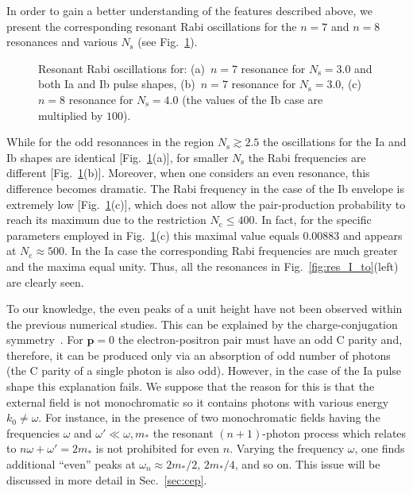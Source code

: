 \documentclass[preprint,aps,prd,showpacs,floatfix]{revtex4-1}
\begin{document}
\indent In order to gain a better understanding of the features described above, we present the corresponding resonant Rabi oscillations for the $n=7$ and $n=8$ resonances and various $N_\text{s}$ (see Fig.~\ref{fig:I_rabi}).
%
\begin{figure}[h]
\caption{Resonant Rabi oscillations for: (a)~$n=7$ resonance for $N_\text{s} = 3.0$ and both Ia and Ib pulse shapes, (b)~$n=7$ resonance for $N_\text{s} = 3.0$, (c)~$n=8$ resonance for $N_\text{s} = 4.0$ (the values of the Ib case are multiplied by $100$).}
\label{fig:I_rabi}
\end{figure}
%
While for the odd resonances in the region $N_\text{s} \gtrsim 2.5$ the oscillations for the Ia and Ib shapes are identical [Fig.~\ref{fig:I_rabi}(a)], for smaller $N_\text{s}$ the Rabi frequencies are different [Fig.~\ref{fig:I_rabi}(b)]. Moreover, when one considers an even resonance, this difference becomes dramatic. The Rabi frequency in the case of the Ib envelope is extremely low [Fig.~\ref{fig:I_rabi}(c)], which does not allow the pair-production probability to reach its maximum due to the restriction $N_\text{c} \leq 400$. In fact, for the specific parameters employed in Fig.~\ref{fig:I_rabi}(c) this maximal value equals 0.00883 and appears at $N_\text{c} \approx 500$. In the Ia case the corresponding Rabi frequencies are much greater and the maxima equal unity. Thus, all the resonances in Fig.~\ref{fig:res_I_to}(left) are clearly seen.

\indent To our knowledge, the even peaks of a unit height have not been observed within the previous numerical studies. This can be explained by the charge-conjugation symmetry~\cite{mocken_pra_2010, akal_prd_2014}. For $\boldsymbol{p}=0$ the electron-positron pair must have an odd C parity and, therefore, it can be produced only via an absorption of odd number of photons (the C parity of a single photon is also odd). However, in the case of the Ia pulse shape this explanation fails. We suppose that the reason for this is that the external field is not monochromatic so it contains photons with various energy $k_0 \neq \omega$. For instance, in the presence of two monochromatic fields having the frequencies $\omega$ and $\omega' \ll \omega, m_*$ the resonant $(n+1)$-photon process which relates to $n\omega + \omega' = 2m_*$ is not prohibited for even $n$. Varying the frequency $\omega$, one finds additional ``even'' peaks at $\omega_n \approx 2m_* /2$, $2m_*/4$, and so on. This issue will be discussed in more detail in Sec.~\ref{sec:cep}.
\end{document}

